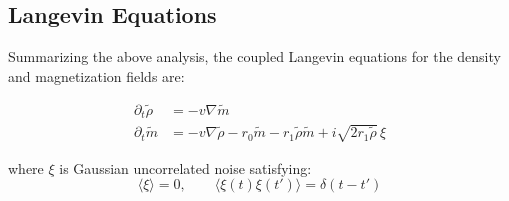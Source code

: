 \subsection{Langevin Equations}\label{subsec:langevin}

Summarizing the above analysis, the coupled Langevin equations for the density and magnetization fields are:

\begin{eqbox}
\begin{align}
\partial_t \tilde{\rho} &= -v\nabla\tilde{m} \label{eq:langevin-rho}\\
\partial_t \tilde{m} &= -v\nabla\tilde{\rho} - r_0\tilde{m} - r_1\tilde{\rho}\tilde{m} + i\sqrt{2r_1\tilde{\rho}}\,\xi \label{eq:langevin-m}
\end{align}
\end{eqbox}

where $\xi$ is Gaussian uncorrelated noise satisfying:
\begin{equation}\label{eq:noise-correlation}
\langle \xi \rangle = 0, \qquad \langle \xi(t)\xi(t') \rangle = \delta(t - t')
\end{equation}

